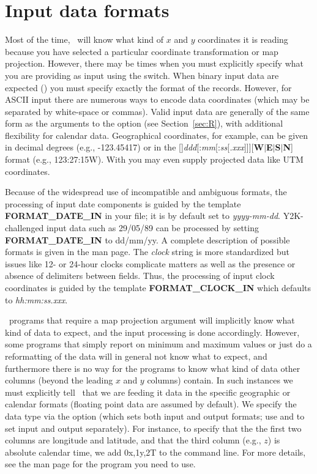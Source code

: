 \section{Input data formats}
\label{sec:input data}

Most of the time, \GMT\ will know what kind of $x$ and $y$ coordinates it is reading because you have selected
a particular coordinate transformation or map projection.  However,
there may be times when you must explicitly specify what you are
providing as input using the  switch. When binary input data are expected () you must
specify exactly the format of the records.  However, for ASCII input there are numerous
ways to encode data coordinates (which may be separated by white-space or commas).  Valid input data are generally
of the same form as the arguments to the  option (see Section~\ref{sec:R}), with additional
flexibility for calendar data.  Geographical coordinates, for example, can be given in decimal degrees
(e.g., -123.45417) or in the
[\PM]\emph{ddd}[:\emph{mm}[:\emph{ss}[\emph{.xxx}]]][\textbf{W}$|$\textbf{E}$|$\textbf{S}$|$\textbf{N}]
format (e.g., 123:27:15W).  With  you may even supply projected data like UTM coordinates.

Because of the widespread use of incompatible and ambiguous formats, the processing of input
date components is guided by the template \textbf{FORMAT\_DATE\_IN} in your
 file; it is by default set to \emph{yyyy-mm-dd}.  Y2K-challenged input data such as
29/05/89 can be processed by setting \textbf{FORMAT\_DATE\_IN}
to dd/mm/yy.  A complete description of possible formats is given in the 
man page.  The \emph{clock} string is more standardized but issues like 12- or 24-hour clocks complicate matters
as well as the presence or absence of delimiters between fields.  Thus, the processing of input
clock coordinates is guided by the template \textbf{FORMAT\_CLOCK\_IN} which defaults to \emph{hh:mm:ss.xxx}.

\GMT\ programs that require a map projection argument will implicitly know what kind of data to expect, and the
input processing is done accordingly.  However, some programs that simply report on minimum and maximum
values or just do a reformatting of the data will in general not know what to expect, and furthermore there is
no way for the programs to know what kind of data other columns (beyond the leading $x$ and $y$ columns) contain.
In such instances we must
explicitly tell \GMT\ that we are feeding it data in the specific geographic or calendar formats (floating point
data are assumed by default).  We specify the data type via the  option (which sets both input and output
formats; use  and  to set input and output separately).  For instance, to specify that the
the first two columns are longitude and latitude, and that the third column (e.g., $z$) is absolute calendar time, we add
0x,1y,2T to the command line.  For more details, see the man page for the program you need to use.

